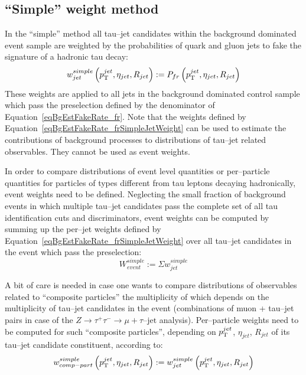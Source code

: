 \subsection{``Simple'' weight method}
%
In the ``simple'' method all tau--jet candidates within the background dominated
event sample are weighted by the probabilities of quark and gluon jets to fake
the signature of a hadronic tau decay:
\begin{equation}
w_{jet}^{simple} \left( p_{\mathrm{T}}^{jet}, \eta_{jet}, R_{jet} \right) := P_{fr} \left( p_{\mathrm{T}}^{jet}, \eta_{jet}, R_{jet} \right)
\label{eqBgEstFakeRate_frSimpleJetWeight}
\end{equation}
These weights are applied to all jets in the background dominated control sample
which pass the preselection defined by the denominator of
Equation~\ref{eqBgEstFakeRate_fr}.  Note that the weights defined by
Equation~\ref{eqBgEstFakeRate_frSimpleJetWeight} can be used to estimate the
contributions of background processes to distributions of tau--jet related
observables.  They cannot be used as event weights.

In order to compare distributions of event level quantities or per--particle
quantities for particles of types different from tau leptons decaying
hadronically, event weights need to be defined.  Neglecting the small fraction
of background events in which multiple tau--jet candidates pass the complete set
of all tau identification cuts and discriminators, event weights can be computed
by summing up the per--jet weights defined by
Equation~\ref{eqBgEstFakeRate_frSimpleJetWeight} over all tau--jet candidates in
the event which pass the preselection:
\begin{equation}
W_{event}^{simple} := \Sigma w_{jet}^{simple}
\label{eqBgEstFakeRate_frSimpleEventWeight}
\end{equation}

A bit of care is needed in case one wants to compare distributions of
observables related to ``composite particles'' the multiplicity of which depends
on the multiplicity of tau--jet candidates in the event (\eg combinations of
muon + tau--jet pairs in case of the $Z \rightarrow \tau^{+} \tau^{-}
\rightarrow \mu + \tau\mbox{--jet}$ analysis).  Per--particle weights need to be
computed for such ``composite particles'', depending on $p_{\mathrm{T}}^{jet}$,
$\eta_{jet}$, $R_{jet}$ of its tau--jet candidate constituent, according to:
\begin{equation}
w_{comp-part}^{simple} \left( p_{\mathrm{T}}^{jet}, \eta_{jet}, R_{jet} \right) := 
  w_{jet}^{simple} \left( p_{\mathrm{T}}^{jet}, \eta_{jet}, R_{jet} \right)
\label{eqBgEstFakeRate_frSimpleCompositeParticleWeight}
\end{equation}

